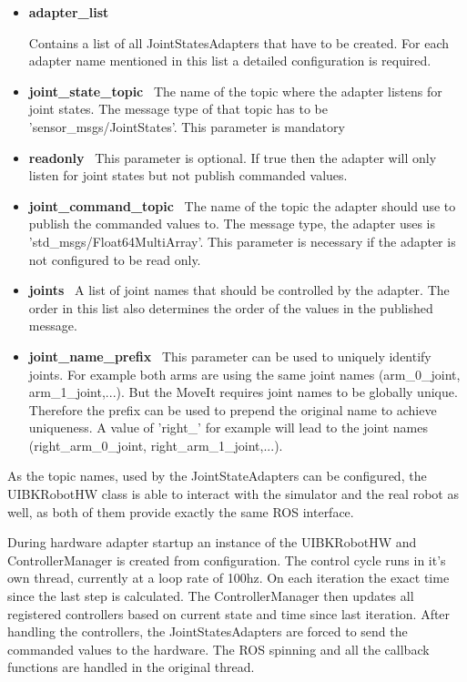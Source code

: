 \begin{itemize}

\item \textbf{adapter\_list} \

Contains a list of all JointStatesAdapters that have to be created. For each adapter name mentioned in this list a detailed configuration is required.

\item \textbf{joint\_state\_topic} \
The name of the topic where the adapter listens for joint states. The message type of that topic has to be 'sensor\_msgs/JointStates'. This parameter is mandatory

\item \textbf{readonly} \
This parameter is optional. If true then the adapter will only listen for joint states but not publish commanded values.

\item \textbf{joint\_command\_topic} \
The name of the topic the adapter should use to publish the commanded values to. The message type, the adapter uses is 'std\_msgs/Float64MultiArray'. This parameter is necessary if the adapter is not configured to be read only.

\item \textbf{joints} \
A list of joint names that should be controlled by the adapter. The order in this list also determines the order of the values in the published message.

\item \textbf{joint\_name\_prefix} \
This parameter can be used to uniquely identify joints. For example both arms are using the same joint names (arm\_0\_joint, arm\_1\_joint,...). But the MoveIt requires joint names to be globally unique. Therefore the prefix can be used to prepend the original name to achieve uniqueness. A value of 'right\_' for example will lead to the joint names (right\_arm\_0\_joint, right\_arm\_1\_joint,...).

\end{itemize}

As the topic names, used by the JointStateAdapters can be configured, the UIBKRobotHW class is able to interact with the simulator and the real robot as well, as both of them provide exactly the same ROS interface.

During hardware adapter startup an instance of the UIBKRobotHW and ControllerManager is created from configuration. The control cycle runs in it's own thread, currently at a loop rate of 100hz. On each iteration the exact time since the last step is calculated. The ControllerManager then updates all registered controllers based on current state and time since last iteration. After handling the controllers, the JointStatesAdapters are forced to send the commanded values to the hardware. The ROS spinning and all the callback functions are handled in the original thread.




